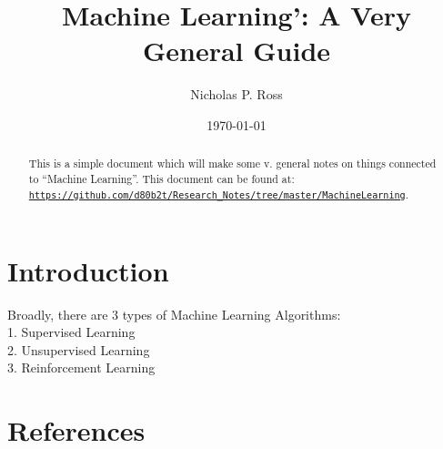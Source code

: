 \documentclass[11pt]{article}
\begin{document}
\title{Machine Learning': A Very General Guide}
\author{Nicholas P. Ross}
\date{\today}
\maketitle


\begin{abstract}
This is a simple document which will make some v. general notes on 
things connected to ``Machine Learning''. This document can be found at:\\
\href{https://github.com/d80b2t/Research_Notes/tree/master/MachineLearning}{\tt https://github.com/d80b2t/Research_Notes/tree/master/MachineLearning}. 
\end{abstract}



\section{Introduction}
Broadly, there are 3 types of Machine Learning Algorithms:\\

1. Supervised Learning\\
2. Unsupervised Learning\\
3. Reinforcement Learning\\



 













\section{References}



\end{document}

